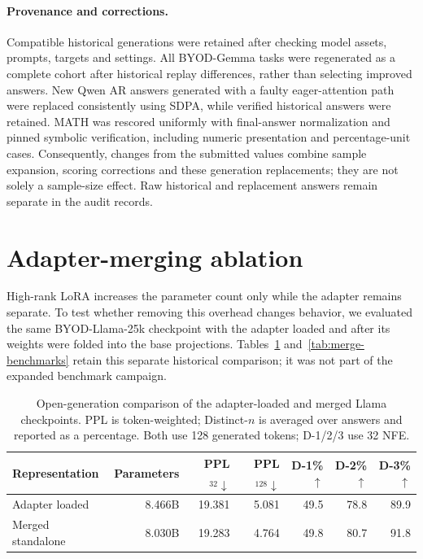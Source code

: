\documentclass{article}
\begin{document}
\paragraph{Provenance and corrections.} Compatible historical generations were retained after checking model assets, prompts, targets and settings. All BYOD-Gemma tasks were regenerated as a complete cohort after historical replay differences, rather than selecting improved answers. New Qwen AR answers generated with a faulty eager-attention path were replaced consistently using SDPA, while verified historical answers were retained. MATH was rescored uniformly with final-answer normalization and pinned symbolic verification, including numeric presentation and percentage-unit cases. Consequently, changes from the submitted values combine sample expansion, scoring corrections and these generation replacements; they are not solely a sample-size effect. Raw historical and replacement answers remain separate in the audit records.



\section{Adapter-merging ablation}
\label{app:merge}

High-rank LoRA increases the parameter count only while the adapter remains separate. To test whether removing this overhead changes behavior, we evaluated the same BYOD-Llama-25k checkpoint with the adapter loaded and after its weights were folded into the base projections. Tables~\ref{tab:merge-open-generation} and~\ref{tab:merge-benchmarks} retain this separate historical comparison; it was not part of the expanded benchmark campaign.

\begin{table}[h]
\caption{Open-generation comparison of the adapter-loaded and merged Llama checkpoints. PPL is token-weighted; Distinct-$n$ is averaged over answers and reported as a percentage. Both use 128 generated tokens; D-1/2/3 use 32 NFE.}
\label{tab:merge-open-generation}
\centering
\scriptsize
\begin{tabular}{lrrrrrr}
\toprule
Representation & Parameters & PPL$_{32}\downarrow$ & PPL$_{128}\downarrow$ & D-1\%$\uparrow$ & D-2\%$\uparrow$ & D-3\%$\uparrow$ \\
\midrule
Adapter loaded & 8.466B & 19.381 & 5.081 & 49.5 & 78.8 & 89.9 \\
Merged standalone & 8.030B & 19.283 & 4.764 & 49.8 & 80.7 & 91.8 \\
\bottomrule
\end{tabular}
\end{table}
\end{document}
